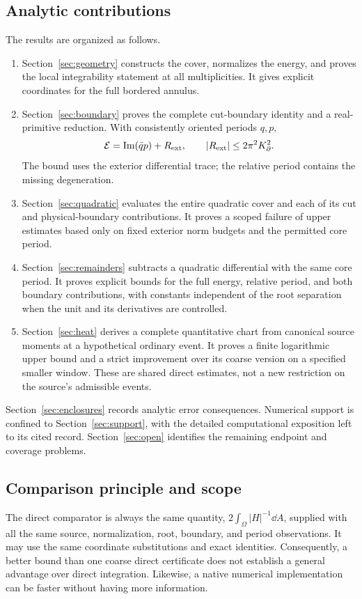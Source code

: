 \subsection{Analytic contributions}
The results are organized as follows.
\begin{enumerate}
\item Section~\ref{sec:geometry} constructs the cover, normalizes the
energy, and proves the local integrability statement at all multiplicities.
It gives explicit coordinates for the full bordered annulus.
\item Section~\ref{sec:boundary} proves the complete cut-boundary identity
and a real-primitive reduction. With consistently oriented periods $q,p$,
\begin{equation}\label{eq:roadmapGreen}
 \mathcal E=\operatorname{Im}(\bar q p)+R_{\mathrm{ext}},\qquad
 |R_{\mathrm{ext}}|\le 2\pi^2K_\partial^2.
\end{equation}
The bound uses the exterior differential trace; the relative period
contains the missing degeneration.
\item Section~\ref{sec:quadratic} evaluates the entire quadratic cover and
each of its cut and physical-boundary contributions. It proves a scoped
failure of upper estimates based only on fixed exterior norm budgets and
the permitted core period.
\item Section~\ref{sec:remainders} subtracts a quadratic differential with
the same core period. It proves explicit bounds for the full energy,
relative period, and both boundary contributions, with constants independent
of the root separation when the unit and its derivatives are controlled.
\item Section~\ref{sec:heat} derives a complete quantitative chart from
canonical source moments at a hypothetical ordinary event. It proves a
finite logarithmic upper bound and a strict improvement over its coarse
version on a specified smaller window. These are shared direct estimates,
not a new restriction on the source's admissible events.
\end{enumerate}
Section~\ref{sec:enclosures} records analytic error consequences. Numerical
support is confined to Section~\ref{sec:support}, with the detailed
computational exposition left to its cited record. Section~\ref{sec:open}
identifies the remaining endpoint and coverage problems.

\subsection{Comparison principle and scope}
The direct comparator is always the same quantity,
$2\int_\Omega |H|^{-1}\dd A$, supplied with all the same source,
normalization, root, boundary, and period observations. It may use the
same coordinate substitutions and exact identities. Consequently, a
better bound than one coarse direct certificate does not establish a
general advantage over direct integration. Likewise, a native numerical
implementation can be faster without having more information.

